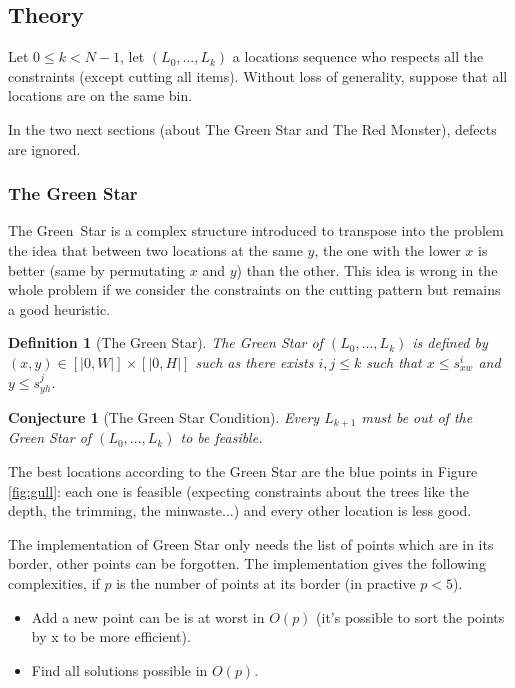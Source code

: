 \documentclass{article}
\newtheorem{definition}{Definition}
\newtheorem{conjecture}{Conjecture}
\begin{document}
    \subsection{Theory}
    Let $0 \leq k  < N - 1$, let $(L_0, ..., L_k)$ a locations sequence who respects all the constraints (except cutting all items). Without loss of  generality, suppose that all locations are on the same bin.

    In the two next sections (about The Green Star and The Red Monster), defects are ignored.

        \subsubsection{The Green Star}

The Green Star is a complex structure introduced to transpose into the problem the idea that between two locations at the same $y$, the one with the lower $x$ is better (same by permutating $x$ and $y$) than the other. This idea is wrong in the whole problem if we consider the constraints on the cutting pattern but remains a good heuristic.

\begin{definition}[The Green Star]
    The Green Star of $(L_0, ..., L_k)$ is defined by $ (x, y) \in [|0, W|]\times[|0, H|]$ such as there exists $i, j \leq k$ such that $x \leq s^i_{xw}$ and $y \leq s^j_{yh}$.
\end{definition}

\begin{conjecture}[The Green Star Condition]
    Every $L_{k + 1}$ must be out of the Green Star of $(L_0, ..., L_k)$ to be feasible.
\end{conjecture}

The best locations according to the Green Star are the blue points in Figure \ref{fig:gull}: each one is feasible (expecting constraints about the trees like the depth, the trimming, the minwaste...) and every other location is less good.

The implementation of Green Star only needs the list of points which are in its border, other points can be forgotten. The implementation gives the following complexities, if $p$ is the number of points at its border (in practive $p < 5$).

\begin{itemize}
    \item Add a new point can be is at worst in $O(p)$ (it's possible to sort the points by x to be more efficient).
    \item Find all solutions possible in $O(p)$.
\end{itemize}
\end{document}
